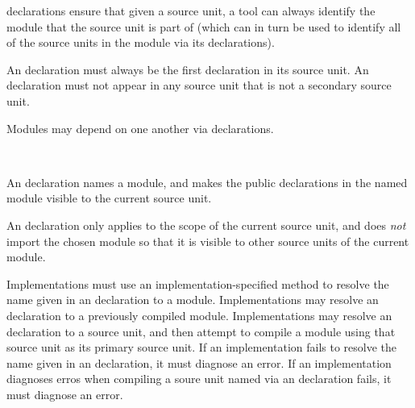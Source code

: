 \begin{Rationale}
 declarations ensure that given a source unit, a tool can always identify the module that the source unit is part of (which can in turn be used to identify all of the source units in the module via its  declarations).
\end{Rationale}

An  declaration must always be the first declaration in its source unit.
An  declaration must not appear in any source unit that is not a secondary source unit.



Modules may depend on one another via  declarations.

\begin{Syntax}
   \\
      \code{;}
\end{Syntax}

An  declaration names a module, and makes the public declarations in the named module visible to the current source unit.

\begin{Note} 
An  declaration only applies to the scope of the current source unit, and does \emph{not} import the chosen module so that it is visible to other source units of the current module.
\end{Note}

Implementations must use an implementation-specified method to resolve the name given in an  declaration to a module.
Implementations may resolve an  declaration to a previously compiled module.
Implementations may resolve an  declaration to a source unit, and then attempt to compile a module using that source unit as its primary source unit.
If an implementation fails to resolve the name given in an  declaration, it must diagnose an error.
If an implementation diagnoses erros when compiling a soure unit named via an  declaration fails, it must diagnose an error.

